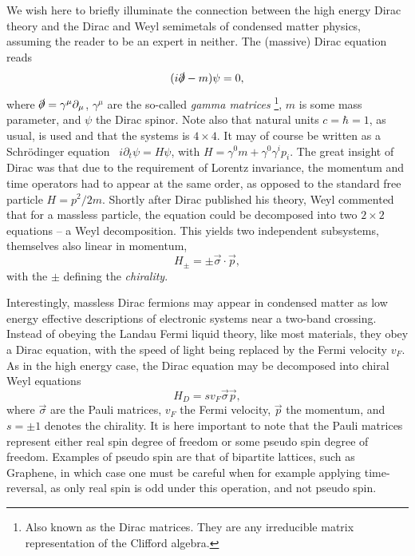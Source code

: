We wish here to briefly illuminate the connection between the high energy Dirac theory and the Dirac and Weyl semimetals of condensed matter physics, assuming the reader to be an expert in neither.
The (massive) Dirac equation reads
\begin{equation}
  (i \slashed{\partial} - m ) \psi = 0,
\end{equation}
where \( \slashed{\partial} = \gamma^{\mu} \partial_{\mu} \), \( \gamma^{\mu} \) are the so-called \emph{gamma matrices}%
\footnote{Also known as the Dirac matrices. They are any irreducible matrix representation of the Clifford algebra.}, \( m \) is some mass parameter, and \( \psi \) the Dirac spinor.
Note also that natural units \( c = \hbar = 1 \), as usual, is used and that the systems is \( 4\times 4 \).
It may of course be written as a Schrödinger equation~\cite{chernodubThermalTransportGeometry2021} \( i \partial_t \psi = H \psi \), with \( H = \gamma^0 m + \gamma^0\gamma^ip_i \).
The great insight of Dirac was that due to the requirement of Lorentz invariance, the momentum and time operators had to appear at the same order, as opposed to the standard free particle \( H = p^2 /2m \).
Shortly after Dirac published his theory, Weyl commented that for a massless particle, the equation could be decomposed into two \( 2 \times 2 \) equations -- a Weyl decomposition.
This yields two independent subsystems, themselves also linear in momentum,
\begin{equation}
  \label{eq:156}
  H_{\pm} = \pm \vec{\sigma} \cdot \vec{p},
\end{equation}
with the \( \pm \) defining the \emph{chirality}.

Interestingly, massless Dirac fermions may appear in condensed matter as low energy effective descriptions of electronic systems near a two-band crossing.
Instead of obeying the Landau Fermi liquid theory, like most materials, they obey a Dirac equation, with the speed of light being replaced by the Fermi velocity $v_F$.
As in the high energy case, the Dirac equation may be decomposed into chiral Weyl equations
\begin{equation}
  \label{eq:3}
H_D = s v_{F} \vec{\sigma} \vec{p},
\end{equation}
where $\vec{\sigma}$ are the Pauli matrices, $v_F$ the Fermi velocity, $\vec{p}$ the momentum, and $s=\pm 1$ denotes the chirality.
It is here important to note that the Pauli matrices represent either real spin degree of freedom or some pseudo spin degree of freedom.
Examples of pseudo spin are that of bipartite lattices, such as Graphene, in which case one must be careful when for example applying time-reversal, as only real spin is odd under this operation, and not pseudo spin.

